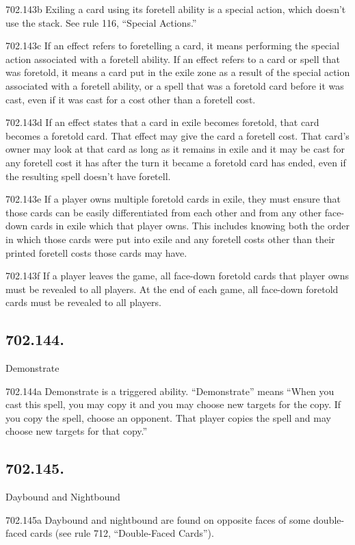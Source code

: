 702.143b Exiling a card using its foretell ability is a special action, which doesn’t use the stack. See rule 116, “Special Actions.”

702.143c If an effect refers to foretelling a card, it means performing the special action associated with a foretell ability. If an effect refers to a card or spell that was foretold, it means a card put in the exile zone as a result of the special action associated with a foretell ability, or a spell that was a foretold card before it was cast, even if it was cast for a cost other than a foretell cost.

702.143d If an effect states that a card in exile becomes foretold, that card becomes a foretold card. That effect may give the card a foretell cost. That card’s owner may look at that card as long as it remains in exile and it may be cast for any foretell cost it has after the turn it became a foretold card has ended, even if the resulting spell doesn’t have foretell.

702.143e If a player owns multiple foretold cards in exile, they must ensure that those cards can be easily differentiated from each other and from any other face-down cards in exile which that player owns. This includes knowing both the order in which those cards were put into exile and any foretell costs other than their printed foretell costs those cards may have.

702.143f If a player leaves the game, all face-down foretold cards that player owns must be revealed to all players. At the end of each game, all face-down foretold cards must be revealed to all players.

\subsection*{702.144.}
Demonstrate

702.144a Demonstrate is a triggered ability. “Demonstrate” means “When you cast this spell, you may copy it and you may choose new targets for the copy. If you copy the spell, choose an opponent. That player copies the spell and may choose new targets for that copy.”

\subsection*{702.145.}
Daybound and Nightbound

702.145a Daybound and nightbound are found on opposite faces of some double-faced cards (see rule 712, “Double-Faced Cards”).

